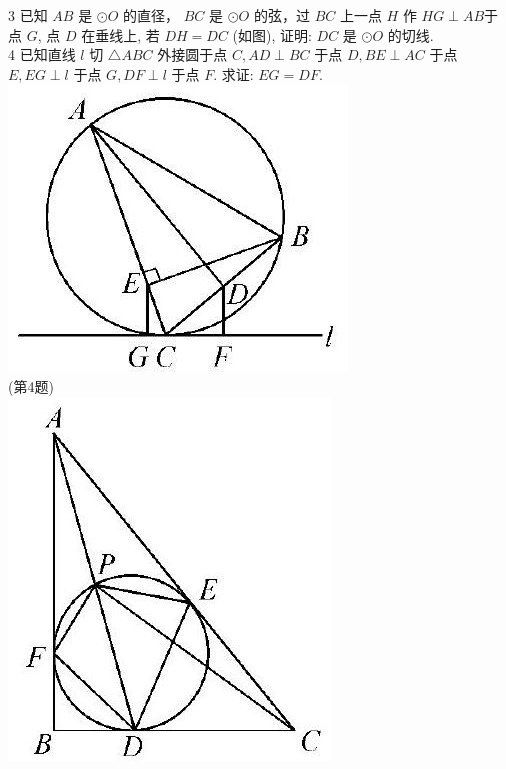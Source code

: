 \documentclass[10pt]{article}
\begin{document}
3 已知 $A B$ 是 $\odot O$ 的直径， $B C$ 是 $\odot O$ 的弦，过 $B C$ 上一点 $H$ 作 $H G \perp A B$于点 $G$, 点 $D$ 在垂线上, 若 $D H=D C$ (如图), 证明: $D C$ 是 $\odot O$ 的切线.\\
4 已知直线 $l$ 切 $\triangle A B C$ 外接圆于点 $C, A D \perp B C$ 于点 $D, B E \perp A C$ 于点 $E, E G \perp l$ 于点 $G, D F \perp l$ 于点 $F$. 求证: $E G=D F$.\\
\includegraphics[max width=\textwidth, center]{2024_10_30_66b8e5e701da2093c133g-041(3)}\\
(第4题)\\
\includegraphics[max width=\textwidth, center]{2024_10_30_66b8e5e701da2093c133g-041(2)}\\
\end{document}
